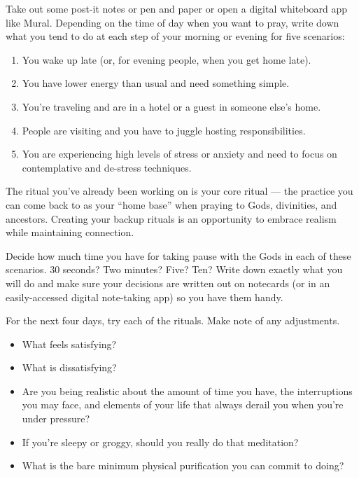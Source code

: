 \documentclass[
]{book}
\providecommand{\tightlist}{%
  \setlength{\itemsep}{0pt}\setlength{\parskip}{0pt}}
\begin{document}
Take out some post-it notes or pen and paper or open a digital whiteboard app like Mural. Depending on the time of day when you want to pray, write down what you tend to do at each step of your morning or evening for five scenarios:

\begin{enumerate}
\def\labelenumi{\arabic{enumi}.}
\tightlist
\item
  You wake up late (or, for evening people, when you get home late).
\item
  You have lower energy than usual and need something simple.
\item
  You're traveling and are in a hotel or a guest in someone else's home.
\item
  People are visiting and you have to juggle hosting responsibilities.
\item
  You are experiencing high levels of stress or anxiety and need to focus on contemplative and de-stress techniques.
\end{enumerate}

The ritual you've already been working on is your core ritual --- the practice you can come back to as your ``home base'' when praying to Gods, divinities, and ancestors. Creating your backup rituals is an opportunity to embrace realism while maintaining connection.

Decide how much time you have for taking pause with the Gods in each of these scenarios. 30 seconds? Two minutes? Five? Ten? Write down exactly what you will do and make sure your decisions are written out on notecards (or in an easily-accessed digital note-taking app) so you have them handy.

For the next four days, try each of the rituals. Make note of any adjustments.

\begin{itemize}
\tightlist
\item
  What feels satisfying?
\item
  What is dissatisfying?
\item
  Are you being realistic about the amount of time you have, the interruptions you may face, and elements of your life that always derail you when you're under pressure?
\item
  If you're sleepy or groggy, should you really do that meditation?
\item
  What is the bare minimum physical purification you can commit to doing?
\end{itemize}
\end{document}

